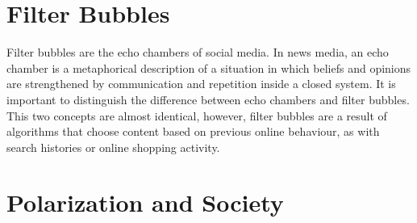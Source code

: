 \section{Filter Bubbles}

Filter bubbles are the echo chambers of social media. In news media, an echo chamber is a metaphorical description of a situation in which beliefs  and opinions are strengthened by communication and repetition inside a closed system. It is important to distinguish the difference between echo chambers and filter bubbles. This two concepts are almost identical, however,  filter bubbles are a result of algorithms that choose content based on previous online behaviour, as with search histories or online shopping activity.


\section{Polarization and Society}

